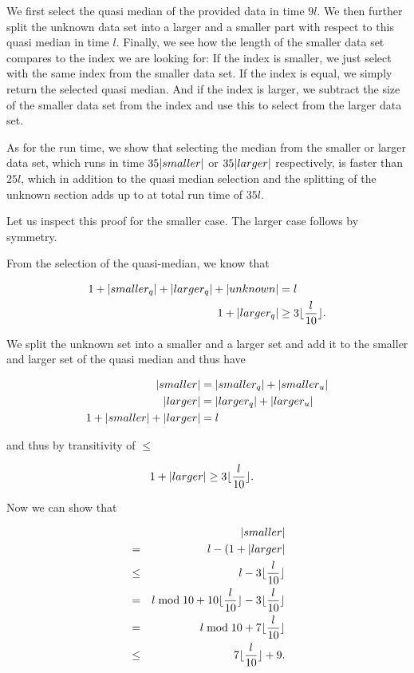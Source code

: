 We first select the quasi median of the provided data in time $9l$. We then further split the unknown data set into a larger and a smaller part with respect to this quasi median in time $l$. Finally, we see how the length of the smaller data set compares to the index we are looking for: If the index is smaller, we just select with the same index from the smaller data set. If the index is equal, we simply return the selected quasi median. And if the index is larger, we subtract the size of the smaller data set from the index and use this to select from the larger data set.

As for the run time, we show that selecting the median from the smaller or larger data set, which runs in time $35 \lvert smaller\rvert$ or $35 \lvert larger\rvert$ respectively, is faster than $25l$, which in addition to the quasi median selection and the splitting of the unknown section adds up to at total run time of $35l$.

Let us inspect this proof for the smaller case. The larger case follows by symmetry.

From the selection of the quasi-median, we know that

\begin{align*}
    1 + \lvert smaller_q\rvert + \lvert larger_q\rvert + \lvert unknown\rvert &= l\\
    1 + \lvert larger_q\rvert &\geq 3 \lfloor \frac l {10} \rfloor.
\end{align*}

We split the unknown set into a smaller and a larger set and add it to the smaller and larger set of the quasi median and thus have

\begin{align*}
    \lvert smaller\rvert &= \lvert smaller_q\rvert + \lvert smaller_u\rvert \\
    \lvert larger\rvert &= \lvert larger_q\rvert + \lvert larger_u\rvert \\
    1 + \lvert smaller\rvert + \lvert larger\rvert &= l
\end{align*}

and thus by transitivity of $\leq$

\begin{align*}
    1 + \lvert larger\rvert &\geq 3 \lfloor \frac l {10} \rfloor.
\end{align*}

Now we can show that

\begin{align*}
    && \lvert smaller\rvert \\
    &=& l - (1 + \lvert larger\rvert \\
    &\leq& l - 3 \lfloor \frac l {10} \rfloor \\
    &=& l \bmod 10 + 10 \lfloor \frac l {10} \rfloor - 3 \lfloor \frac l {10} \rfloor \\
    &=& l \bmod 10 + 7 \lfloor \frac l {10} \rfloor \\
    &\leq& 7 \lfloor \frac l {10} \rfloor + 9.
\end{align*}


